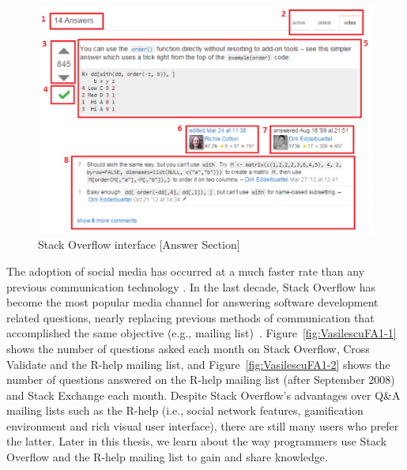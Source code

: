 \documentclass{sig-alternate-05-2015}
\begin{document}
	\begin{figure}[!htb]
	\centering
	\includegraphics[width=\columnwidth]{Figures/SOInterface_B}
	\caption{Stack Overflow interface [Answer Section]}
	\label{fig:SOInterface_B}
	\end{figure}

	The adoption of social media has occurred at a much faster rate than any previous communication technology \cite{Chui2012}.
	In the last decade, Stack Overflow has become the most popular media channel for answering software development related questions, nearly replacing previous methods of communication that accomplished the same objective (e.g., mailing list)~\cite{Vasilescu2014c}.
	Figure~\ref{fig:VasilescuFA1-1} shows the number of questions asked each month on Stack Overflow, Cross Validate and the R-help mailing list, and Figure~\ref{fig:VasilescuFA1-2} shows the number of questions answered on the R-help mailing list (after September 2008) and Stack Exchange each month.
	Despite Stack Overflow's advantages over Q\&A mailing lists such as the R-help (i.e., social network features, gamification environment and rich visual user interface), there are still many users who prefer the latter.
	Later in this thesis, we learn about the way programmers use Stack Overflow and the R-help mailing list to gain and share knowledge.
\end{document}

